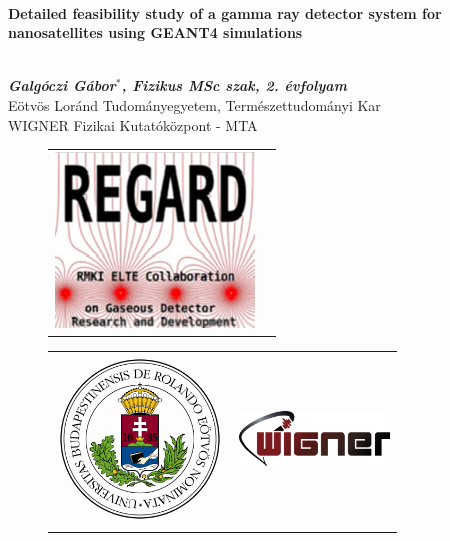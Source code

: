 \documentclass[12pt, a4paper,titlepage]{article}
\numberwithin{equation}{section}
\numberwithin{figure}{section}
\begin{document}
\begin{titlepage}

\begin{center}
\ \\

\vspace{1 cm}
\begin{large}\textbf{Detailed feasibility study of a gamma ray detector system for nanosatellites using GEANT4 simulations}\end{large}\\
\vspace{1 cm}
\textit{\textbf{Galgóczi Gábor$^{*}$, Fizikus MSc szak, 2. évfolyam}}\\
Eötvös Loránd Tudományegyetem, Természettudományi Kar\\
WIGNER Fizikai Kutatóközpont - MTA\\
\vspace{1.5cm}
\begin{figure}[H]
\centering
\begin{tabular}{ >{\centering\arraybackslash}m{2in}  >{\centering\arraybackslash}m{2.5in}  }

\includegraphics[width=53.0mm]{images/regard.jpg}
\end{tabular}
\end{figure}

\begin{figure}[H]
\centering
\begin{tabular}{ >{\centering\arraybackslash}m{2in}  >{\centering\arraybackslash}m{2.5in}  }

\includegraphics[width=45.0mm]{images/elte.png} \parbox{0pt}{\rule{0pt}{2ex+\baselineskip}} &
\hspace{0.2 cm}
\includegraphics[width=40.0mm]{images/wigner.png}
\end{tabular}
\end{figure}



\end{center}
\end{titlepage}
\end{document}
